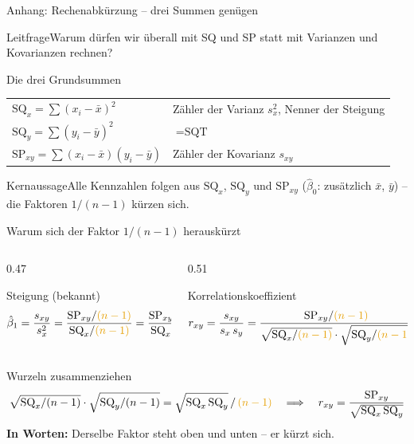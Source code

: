 \documentclass[aspectratio=169,11pt]{beamer}
\newcommand{\kernaussage}[1]{\begin{alertblock}{Kernaussage}#1\end{alertblock}}
\newcommand{\leitfrage}[1]{\begin{exampleblock}{Leitfrage}#1\end{exampleblock}}
\newcommand{\SQx}{\text{SQ}_x}
\newcommand{\SQy}{\text{SQ}_y}
\newcommand{\SPxy}{\text{SP}_{xy}}
\begin{document}
\begin{frame}{Anhang: Rechenabkürzung -- drei Summen genügen}
  \leitfrage{Warum dürfen wir überall mit SQ und SP statt mit Varianzen und Kovarianzen rechnen?}

  \begin{block}{Die drei Grundsummen}
    \renewcommand{\arraystretch}{1.4}
    \begin{tabular}{@{}l l@{}}
      $\SQx = \sum (x_i - \bar{x})^{2}$               & Zähler der Varianz $s_x^{2}$, Nenner der Steigung \\
      $\SQy = \sum (y_i - \bar{y})^{2}$               & $= \text{SQT}$ \\
      $\SPxy = \sum (x_i - \bar{x})(y_i - \bar{y})$   & Zähler der Kovarianz $s_{xy}$
    \end{tabular}
  \end{block}

  \bigskip

  \kernaussage{Alle Kennzahlen folgen aus $\SQx$, $\SQy$ und $\SPxy$ ($\hat{\beta}_0$:
    zusätzlich $\bar{x}$, $\bar{y}$) -- die Faktoren $1/(n-1)$ kürzen sich.}
\end{frame}

\begin{frame}{Warum sich der Faktor $1/(n-1)$ herauskürzt}
  \begin{columns}[T]
    \begin{column}{0.47\textwidth}
      \begin{block}{Steigung (bekannt)}
        \vspace{-2pt}
        \[
          \hat{\beta}_1 = \frac{s_{xy}}{s_x^{2}}
          = \frac{\SPxy/{\color{hsbiaccent}(n-1)}}{\SQx/{\color{hsbiaccent}(n-1)}}
          = \frac{\SPxy}{\SQx}
        \]
      \end{block}
    \end{column}
    \begin{column}{0.51\textwidth}
      \begin{block}{Korrelationskoeffizient}
        \vspace{-2pt}
        \[
          r_{xy} = \frac{s_{xy}}{s_x\,s_y}
          = \frac{\SPxy/{\color{hsbiaccent}(n-1)}}
                 {\sqrt{\SQx/{\color{hsbiaccent}(n-1)}}\cdot\sqrt{\SQy/{\color{hsbiaccent}(n-1)}}}
        \]
      \end{block}
    \end{column}
  \end{columns}

  \begin{block}{Wurzeln zusammenziehen}
    \vspace{-6pt}
    \[
      \sqrt{\SQx/(n-1)}\cdot\sqrt{\SQy/(n-1)}
      = \sqrt{\SQx\,\SQy}\,/\,{\color{hsbiaccent}(n-1)}
      \quad\Longrightarrow\quad
      r_{xy} = \frac{\SPxy}{\sqrt{\SQx\,\SQy}}
    \]
    \textbf{In Worten:} Derselbe Faktor steht oben und unten -- er kürzt sich.
  \end{block}
\end{frame}
\end{document}
